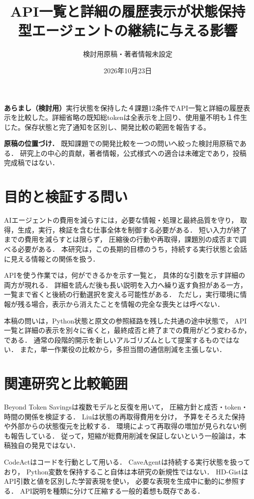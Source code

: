 \documentclass[uplatex,a4paper,twocolumn,10pt]{jsarticle}
\title{API一覧と詳細の履歴表示が\newline 状態保持型エージェントの継続に与える影響}
\author{検討用原稿・著者情報未設定}
\date{2026年10月23日}
\begin{document}
\raggedbottom
\maketitle
\noindent\textbf{あらまし（検討用）}\quad 実行状態を保持した４課題12条件でAPI一覧と詳細の履歴表示を比較した。詳細省略の既知総tokenは全表示を上回り、使用量不明も１件生じた。保存状態と完了通知を区別し、開発比較の範囲を報告する。
\par\medskip
\noindent\textbf{原稿の位置づけ．}
既知課題での開発比較を一つの問いへ絞った検討用原稿である．
研究上の中心的貢献，著者情報，公式様式への適合は未確定であり，投稿完成稿ではない．

\section{目的と検証する問い}
AIエージェントの費用を減らすには，必要な情報・処理と最終品質を守り，
取得，生成，実行，検証を含む仕事全体を制御する必要がある．
短い入力が終了までの費用を減らすとは限らず，
圧縮後の行動や再取得，課題別の成否まで調べる必要がある\cite{beyond}．
本研究は，この長期的目標のうち，持続する実行状態と会話に見える情報との関係を扱う．

APIを使う作業では，何ができるかを示す一覧と，
具体的な引数を示す詳細の両方が現れる．
詳細を読んだ後も長い説明を入力へ繰り返す負担がある一方，
一覧まで省くと後続の行動選択を変える可能性がある．
ただし，実行環境に情報が残る場合，表示から消えたことを情報の完全な喪失とは呼べない．

本稿の問いは，Python状態と原文の参照経路を残した共通の途中状態で，
API一覧と詳細の表示を別々に省くと，最終成否と終了までの費用がどう変わるか，である．
通常の段階的開示を新しいアルゴリズムとして提案するものではない．
また，単一作業役の比較から，多担当間の通信削減を主張しない．

\section{関連研究と比較範囲}
Beyond Token Savings\cite{beyond}は複数モデルと反復を用いて，
圧縮方針と成否・token・時間の関係を検証する．
Liu\cite{interaction}は状態の再取得費用を分け，
予算をそろえた保持や外部からの状態復元を比較する．
環境によって再取得の増加が見られない例も報告している．
従って，短縮が総費用削減を保証しないという一般論は，本稿独自の発見ではない．

CodeAct\cite{codeact}はコードを行動として用いる．
CaveAgent\cite{cave}は持続する実行状態を扱っており，
Python変数を保持すること自体は本研究の新規性ではない．
HD-Gist\cite{hdgist}はAPI引数と値を区別した学習表現を使い，
必要な表現を生成中に動的に参照する．
API説明を種類に分けて圧縮する一般的着想も既存である．
\end{document}
